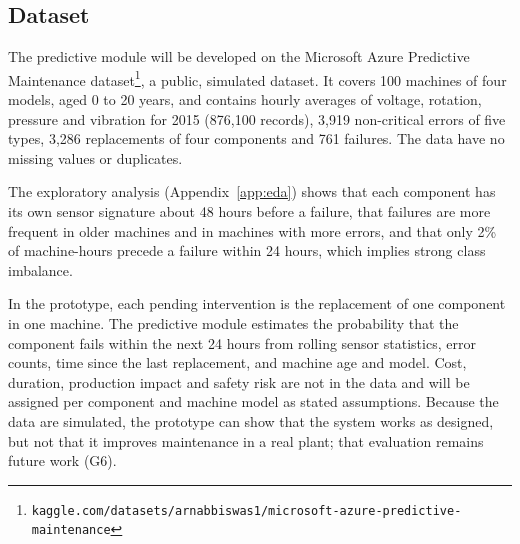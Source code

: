 \subsection{Dataset}
\label{sec:dataset}

The predictive module will be developed on the Microsoft Azure Predictive Maintenance dataset\footnote{\texttt{kaggle.com/datasets/arnabbiswas1/microsoft-azure-predictive-maintenance}}, a public, simulated dataset. It covers 100 machines of four models, aged 0 to 20 years, and contains hourly averages of voltage, rotation, pressure and vibration for 2015 (876,100 records), 3,919 non-critical errors of five types, 3,286 replacements of four components and 761 failures. The data have no missing values or duplicates.

The exploratory analysis (Appendix~\ref{app:eda}) shows that each component has its own sensor signature about 48 hours before a failure, that failures are more frequent in older machines and in machines with more errors, and that only 2\% of machine-hours precede a failure within 24 hours, which implies strong class imbalance.

In the prototype, each pending intervention is the replacement of one component in one machine. The predictive module estimates the probability that the component fails within the next 24 hours from rolling sensor statistics, error counts, time since the last replacement, and machine age and model. Cost, duration, production impact and safety risk are not in the data and will be assigned per component and machine model as stated assumptions. Because the data are simulated, the prototype can show that the system works as designed, but not that it improves maintenance in a real plant; that evaluation remains future work (G6).